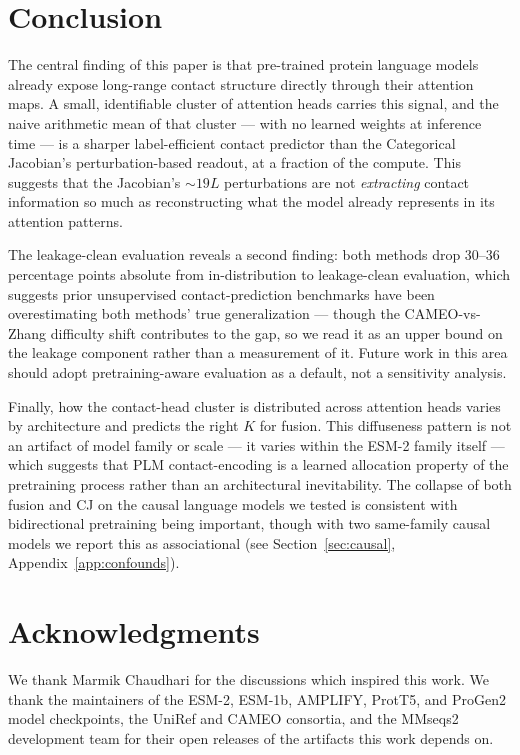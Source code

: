 \documentclass{article}
\begin{document}
\section{Conclusion}

The central finding of this paper is that pre-trained protein language
models already expose long-range contact structure directly through
their attention maps. A small, identifiable cluster of attention heads
carries this signal, and the naive arithmetic mean of that cluster ---
with no learned weights at inference time --- is a sharper label-efficient
contact predictor than the Categorical Jacobian's perturbation-based
readout, at a fraction of the compute. This suggests that the
Jacobian's $\sim 19L$ perturbations are not \emph{extracting} contact
information so much as reconstructing what the model already
represents in its attention patterns.

The leakage-clean evaluation reveals a second finding: both methods drop
30--36 percentage points absolute from in-distribution to
leakage-clean evaluation, which suggests prior unsupervised
contact-prediction benchmarks have been overestimating both methods'
true generalization --- though the CAMEO-vs-Zhang difficulty shift
contributes to the gap, so we read it as an upper bound on the leakage
component rather than a measurement of it. Future work in this area
should adopt pretraining-aware evaluation as a default, not a
sensitivity analysis.

Finally, how the contact-head cluster is distributed across attention
heads varies by architecture and predicts the right $K$ for fusion.
This diffuseness pattern is not an artifact of model family or scale
--- it varies within the ESM-2 family itself --- which suggests that
PLM contact-encoding is a learned allocation property of the
pretraining process rather than an architectural inevitability. The
collapse of both fusion and CJ on the causal language models we tested
is consistent with bidirectional pretraining being important, though with
two same-family causal models we report this as associational
(see Section~\ref{sec:causal}, Appendix~\ref{app:confounds}).

\section*{Acknowledgments}

We thank Marmik Chaudhari for the discussions which inspired this work.
We thank the maintainers of the ESM-2, ESM-1b, AMPLIFY, ProtT5, and
ProGen2 model checkpoints, the UniRef and CAMEO consortia, and the
MMseqs2 development team for their open releases of the artifacts
this work depends on.
\end{document}
